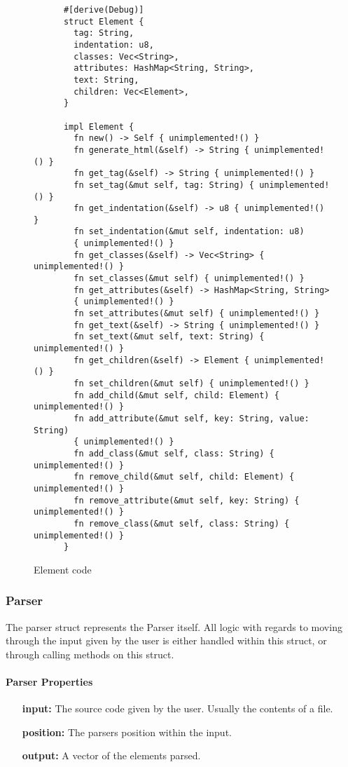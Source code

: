 \begin{figure}[ht!]
    \begin{verbatim}
      #[derive(Debug)]
      struct Element {
        tag: String,
        indentation: u8,
        classes: Vec<String>,
        attributes: HashMap<String, String>,
        text: String,
        children: Vec<Element>,
      }

      impl Element {
        fn new() -> Self { unimplemented!() }
        fn generate_html(&self) -> String { unimplemented!() }
        fn get_tag(&self) -> String { unimplemented!() }
        fn set_tag(&mut self, tag: String) { unimplemented!() }
        fn get_indentation(&self) -> u8 { unimplemented!() }
        fn set_indentation(&mut self, indentation: u8) 
        { unimplemented!() }
        fn get_classes(&self) -> Vec<String> { unimplemented!() }
        fn set_classes(&mut self) { unimplemented!() }
        fn get_attributes(&self) -> HashMap<String, String> 
        { unimplemented!() }
        fn set_attributes(&mut self) { unimplemented!() }
        fn get_text(&self) -> String { unimplemented!() }
        fn set_text(&mut self, text: String) { unimplemented!() }
        fn get_children(&self) -> Element { unimplemented!() }
        fn set_children(&mut self) { unimplemented!() }
        fn add_child(&mut self, child: Element) { unimplemented!() }
        fn add_attribute(&mut self, key: String, value: String) 
        { unimplemented!() }
        fn add_class(&mut self, class: String) { unimplemented!() }
        fn remove_child(&mut self, child: Element) { unimplemented!() }
        fn remove_attribute(&mut self, key: String) { unimplemented!() }
        fn remove_class(&mut self, class: String) { unimplemented!() }
      }
    \end{verbatim}
    \caption{Element code}
\end{figure}

\subsubsection{Parser}
The parser struct represents the Parser itself. All logic with regards to moving through the input given by the user is either handled within this struct, or through calling methods on this struct.

\paragraph{Parser Properties}
\begin{itemize}
    \item[\textbf{input:}] The source code given by the user. Usually the contents of a file.
    \item[\textbf{position:}] The parsers position within the input. 
    \item[\textbf{output:}] A vector of the elements parsed.
\end{itemize}

